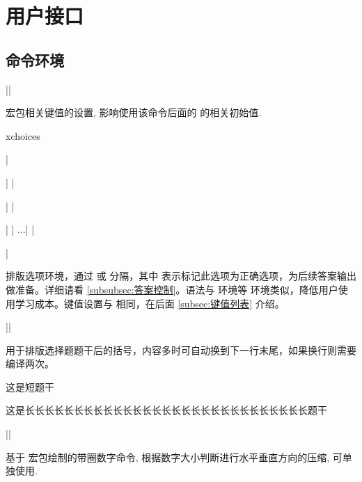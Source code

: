 \documentclass{xdyy-usermanual}
\begin{document}
\section{用户接口}



\subsection{命令环境}


\begin{function}[added = 2022-01-30]{\xchoicesetup}
  \begin{syntax}
    |\xchoicesetup| 
  \end{syntax}
  宏包相关键值的设置, 影响使用该命令后面的  的相关初始值.
\end{function}


\begin{function}[added = 2022-01-30]{xchoices}
  \begin{syntax}
    |\begin{xchoices}| 
    |  \item <item1>|
    |  \item* <item2>|
    |  ...|
    |\end{xchoices}|
  \end{syntax}
  排版选项环境，通过  或  分隔，其中  表示标记此选项为正确选项，为后续答案输出做准备。详细请看 \ref{subsubsec:答案控制}。语法与  环境等  环境类似，降低用户使用学习成本。键值设置与  相同，在后面 \ref{subsec:键值列表} 介绍。
\end{function}

\begin{function}{\paren}
  \begin{syntax}
    |\paren|
  \end{syntax}
  用于排版选择题题干后的括号，内容多时可自动换到下一行末尾，如果换行则需要编译两次。
  \begin{vexample}
    这是短题干 \paren
  \end{vexample}
  \begin{vexample}
    这是长长长长长长长长长长长长长长长长长长长长长长长长长长长长长题干 \paren
  \end{vexample}
\end{function}


\begin{function}{\quan}
  \begin{syntax}
    |\quan| 
  \end{syntax}
  基于  宏包绘制的带圈数字命令, 根据数字大小判断进行水平垂直方向的压缩, 可单独使用. 
  \begin{hexample}
      
  \end{hexample}
\end{function}
\end{document}

